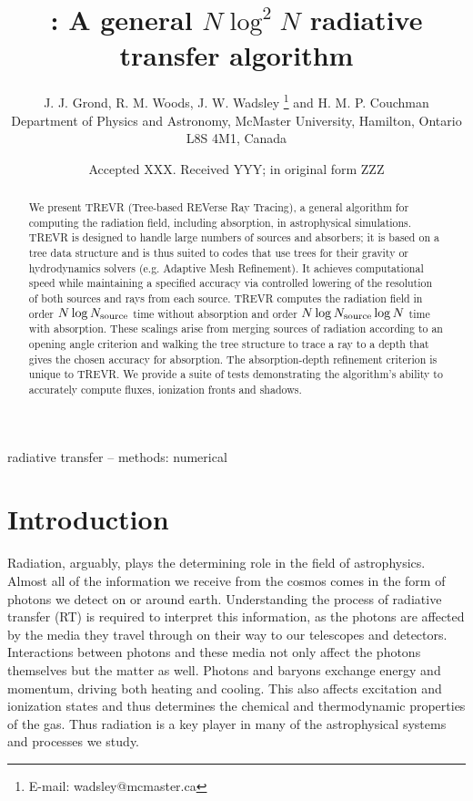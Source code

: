 \documentclass[fleq,usenatbib]{mnras}
\title[]{\acro{}: A general $N\log^2N$ radiative transfer algorithm}
\author[J. J. Grond et al.]{
J. J. Grond,
R. M. Woods,
J. W. Wadsley \thanks{E-mail:  wadsley@mcmaster.ca}
and H. M. P. Couchman
\\
Department of Physics and Astronomy, McMaster University, Hamilton, Ontario L8S
 4M1, Canada}
\date{Accepted XXX. Received YYY; in original form ZZZ}
\newcommand{\acro}{TREVR}
\newcommand{\NS}{N_{\rm source}}
\begin{document}
\label{firstpage}
\pagerange{\pageref{firstpage}--\pageref{lastpage}}
\maketitle

\begin{abstract}
We present \acro{} (Tree-based REVerse Ray Tracing), a general algorithm for 
computing the radiation field, including absorption, in astrophysical 
simulations. \acro{} is designed to handle large numbers of sources and 
absorbers; it is based on a tree data structure and is thus suited to 
codes that use trees for their gravity or hydrodynamics solvers (e.g. Adaptive 
Mesh Refinement). It achieves computational speed while maintaining a 
specified accuracy via controlled lowering of the resolution of both sources 
and rays from each source. \acro{} computes the radiation field in order
${N\log\NS}$ time without absorption and order ${N \log \NS \log{N}}$ time 
with absorption. These scalings arise from merging sources of radiation 
according to an opening angle criterion and walking the tree structure to 
trace a ray to a depth that gives the chosen accuracy for absorption. The 
absorption-depth refinement criterion is unique to \acro{}. We provide a suite 
of tests demonstrating the algorithm's ability to accurately compute fluxes, 
ionization fronts and shadows.   

\end{abstract}

\begin{keywords}
radiative transfer -- methods: numerical
\end{keywords}



\section{Introduction}\label{sec:intr}
Radiation, arguably, plays the determining role in the field of astrophysics. 
Almost all of the information we receive from the cosmos comes in the form of 
photons we detect on or around earth. Understanding the process of radiative 
transfer (RT) is required to interpret this information, as the photons are 
affected by the media they travel through on their way to our telescopes and 
detectors. Interactions between photons and these media not only affect the 
photons themselves but the matter as well. Photons and baryons exchange energy 
and momentum, driving both heating and cooling. This also affects excitation 
and ionization states and thus determines the chemical and thermodynamic 
properties of the gas. Thus radiation is a key player in many of the 
astrophysical systems and processes we study.
\end{document}

